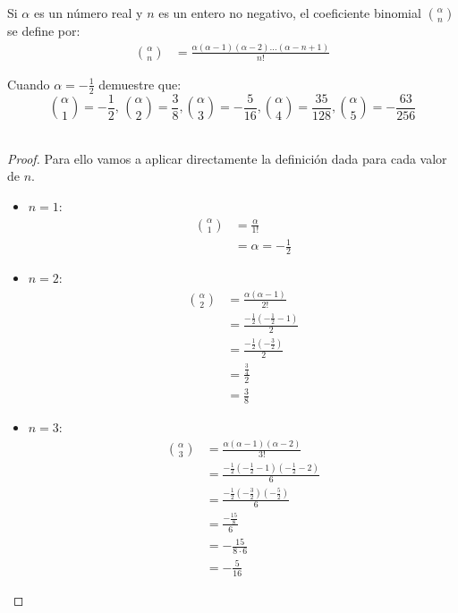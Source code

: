 \documentclass[../main.tex]{subfiles}
\begin{document}
\question Si $\alpha$ es un número real y $n$ es un entero no negativo, el coeficiente binomial $\binom{\alpha}{n}$ se define por:
\begin{align*}
    \binom{\alpha}{n} &= \frac{\alpha (\alpha - 1)(\alpha - 2) \dots (\alpha - n + 1)}{n!}
\end{align*}
\begin{partes}
    \parte Cuando $\alpha = -\frac{1}{2}$ demuestre que:
    $$\binom{\alpha}{1} = -\frac{1}{2},\, \binom{\alpha}{2} = \frac{3}{8}, \binom{\alpha}{3} = -\frac{5}{16}, \binom{\alpha}{4} = \frac{35}{128}, \binom{\alpha}{5} = -\frac{63}{256}$$\\

    \begin{proof}
        Para ello vamos a aplicar directamente la definición dada para cada valor de $n$.
        \begin{itemize}
            \item $n = 1$:
            \begin{align*}
                \binom{\alpha}{1} &= \frac{\alpha}{1!} \\
                &= \alpha = -\frac{1}{2}
            \end{align*}
            \item $n = 2$:
            \begin{align*}
                \binom{\alpha}{2} &= \frac{\alpha (\alpha-1)}{2!}\\
                &= \frac{-\frac{1}{2} \left(-\frac{1}{2} - 1\right)}{2}\\
                &= \frac{-\frac{1}{2} \left(-\frac{3}{2}\right)}{2}\\
                &= \frac{\frac{3}{4}}{2}\\
                &= \frac{3}{8}
            \end{align*}
            \item $n = 3$:
            \begin{align*}
                \binom{\alpha}{3} &= \frac{\alpha (\alpha-1) (\alpha-2)}{3!}\\
                &= \frac{-\frac{1}{2} \left(-\frac{1}{2}-1\right)\left(-\frac{1}{2}-2\right)}{6}\\
                &= \frac{-\frac{1}{2} \left(-\frac{3}{2}\right)\left(-\frac{5}{2}\right)}{6}\\
                &= \frac{-\frac{15}{8}}{6}\\
                &= -\frac{15}{8 \cdot 6}\\
                &= -\frac{5}{16}

\end{align*}
\end{itemize}
\end{proof}
\end{partes}
\end{document}
